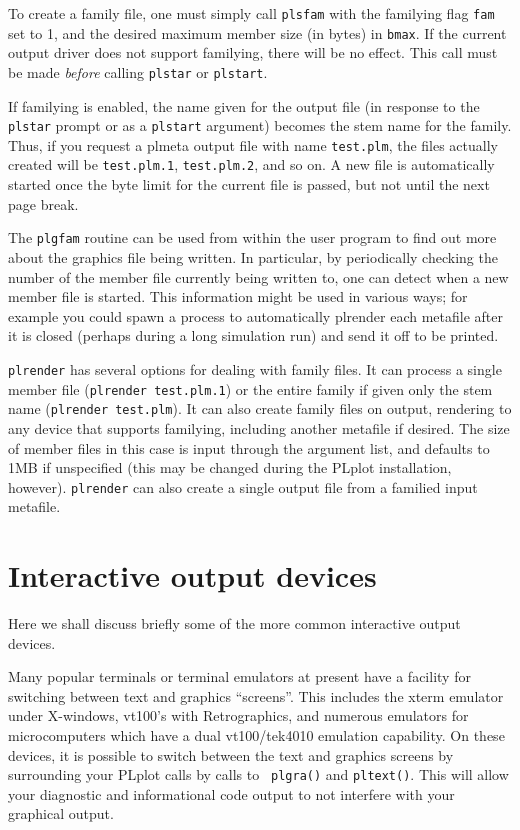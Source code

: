 To create a family file, one must simply call {\tt plsfam} with the
familying flag {\tt fam} set to 1, and the desired maximum member size
(in bytes) in {\tt bmax}.  If the current output driver does not support
familying, there will be no effect.  This call must be made {\em before}
calling {\tt plstar} or {\tt plstart}.

If familying is enabled, the name given for the output file (in response to
the {\tt plstar} prompt or as a {\tt plstart} argument) becomes the stem
name for the family.  Thus, if you request a plmeta output file with name
{\tt test.plm}, the files actually created will be {\tt test.plm.1},
{\tt test.plm.2}, and so on.  A new file is automatically started once the
byte limit for the current file is passed, but not until the next page break.

The {\tt plgfam} routine can be used from within the user program to find
out more about the graphics file being written.  In particular, by
periodically checking the number of the member file currently being written
to, one can detect when a new member file is started.  This information
might be used in various ways; for example you could spawn a process to
automatically plrender each metafile after it is closed (perhaps during a
long simulation run) and send it off to be printed. 

{\tt plrender} has several options for dealing with family files.  It can
process a single member file ({\tt plrender test.plm.1}) or the entire
family if given only the stem name ({\tt plrender test.plm}).  It can also
create family files on output, rendering to any device that supports
familying, including another metafile if desired.  The size of member files
in this case is input through the argument list, and defaults to 1MB if
unspecified (this may be changed during the PLplot installation, however). 
{\tt plrender} can also create a single output file from a familied input
metafile.

\section{Interactive output devices}

Here we shall discuss briefly some of the more common interactive output
devices.  

Many popular terminals or terminal emulators at present have a facility for
switching between text and graphics ``screens''.  This includes the xterm
emulator under X-windows, vt100's with Retrographics, and numerous
emulators for microcomputers which have a dual vt100/tek4010 emulation
capability.  On these devices, it is possible to switch between the text
and graphics screens by surrounding your PLplot calls by calls to {\tt
plgra()} and {\tt pltext()}.  This will allow your diagnostic and
informational code output to not interfere with your graphical output. 

